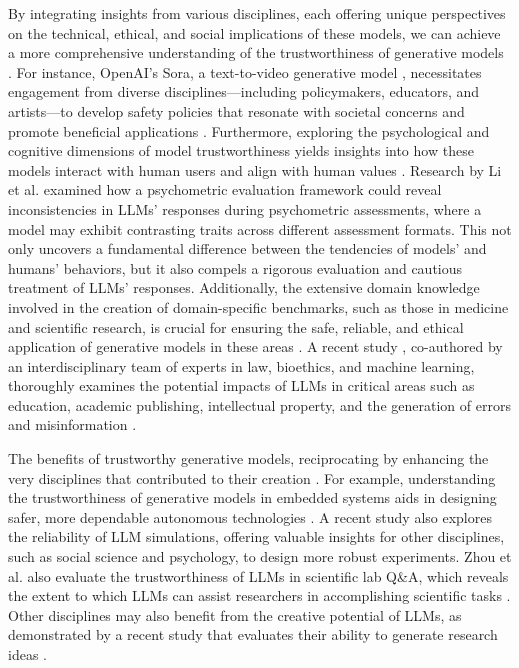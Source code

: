 By integrating insights from various disciplines, each offering unique perspectives on the technical, ethical, and social implications of these models, we can achieve a more comprehensive understanding of the trustworthiness of generative models \cite{li2024quantifying, liu2024sora, al2024ethical, hadi2023survey}. For instance, OpenAI's Sora, a text-to-video generative model \cite{sora_openai}, necessitates engagement from diverse disciplines---including policymakers, educators, and artists---to develop safety policies that resonate with societal concerns and promote beneficial applications \cite{sora_openai_safety}. Furthermore, exploring the psychological and cognitive dimensions of model trustworthiness yields insights into how these models interact with human users and align with human values \cite{li2022does, li2024quantifying, chen2024self, huang2024humanity}. Research by Li et al. \cite{li2024quantifying} examined how a psychometric evaluation framework could reveal inconsistencies in LLMs' responses during psychometric assessments, where a model may exhibit contrasting traits across different assessment formats. This not only uncovers a fundamental difference between the tendencies of models' and humans' behaviors, but it also compels a rigorous evaluation and cautious treatment of LLMs' responses. Additionally, the extensive domain knowledge involved in the creation of domain-specific benchmarks, such as those in medicine and scientific research, is crucial for ensuring the safe, reliable, and ethical application of generative models in these areas \cite{xia2024cares, he2023control}. A recent study \cite{porsdam2023generative}, co-authored by an interdisciplinary team of experts in law, bioethics, and machine learning, thoroughly examines the potential impacts of LLMs in critical areas such as education, academic publishing, intellectual property, and the generation of errors and misinformation \cite{oxford2023ethical}.

The benefits of trustworthy generative models, reciprocating by enhancing the very disciplines that contributed to their creation \cite{Eloundou2023GPTsAG}. For example, understanding the trustworthiness of generative models in embedded systems aids in designing safer, more dependable autonomous technologies \cite{boiko2023autonomous}. A recent study \cite{huang2024social} also explores the reliability of LLM simulations, offering valuable insights for other disciplines, such as social science and psychology, to design more robust experiments. Zhou et al. also evaluate the trustworthiness of LLMs in scientific lab Q\&A, which reveals the extent to which LLMs can assist researchers in accomplishing scientific tasks \cite{zhou2024labsafety}. Other disciplines may also benefit from the creative potential of LLMs, as demonstrated by a recent study that evaluates their ability to generate research ideas \cite{si2024can}.

